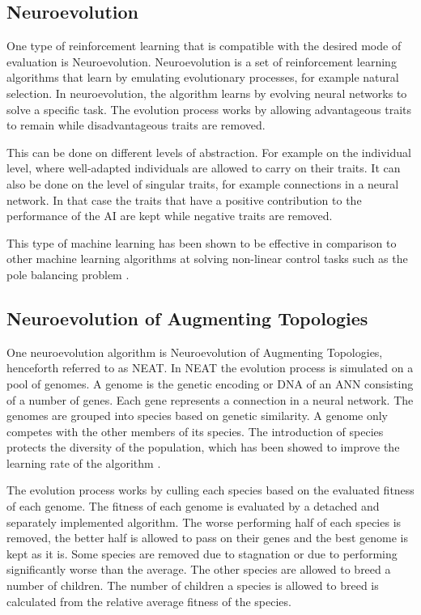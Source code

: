 \subsection{Neuroevolution}
One type of reinforcement learning that is  compatible with the desired mode of evaluation is Neuroevolution. Neuroevolution is a set of reinforcement learning algorithms that learn by emulating evolutionary processes, for example natural selection. In neuroevolution, the algorithm learns by evolving neural networks to solve a specific task. The evolution process works by allowing advantageous traits to remain while disadvantageous traits are removed.  

This can be done on different levels of abstraction. For example on the individual level, where well-adapted individuals are allowed to carry on their traits. It can also be done on the level of singular traits, for example connections in a neural network. In that case the traits that have a positive contribution to the performance of the AI are kept while negative traits are removed. 

This type of machine learning has been shown to be effective in comparison to other machine learning algorithms at solving non-linear control tasks such as the pole balancing problem \cite{gomez:efficient_nonlinear_control}.

\subsection{Neuroevolution of Augmenting Topologies}
\label{theory:neat}
One neuroevolution algorithm is Neuroevolution of Augmenting Topologies, henceforth referred to as NEAT. In NEAT the evolution process is simulated on a pool of genomes. A genome is the genetic encoding or DNA of an ANN consisting of a number of genes. Each gene represents a connection in a neural network. The genomes are grouped into species based on genetic similarity. A genome only competes with the other members of its species. The introduction of species protects the diversity of the population, which has been showed to improve the learning rate of the algorithm \cite{stanley:neat}.  

The evolution process works by culling each species based on the evaluated fitness of each genome. The fitness of each genome is evaluated by a detached and separately implemented algorithm. The worse performing half of each species is removed, the better half is allowed to pass on their genes and the best genome is kept as it is. Some species are removed due to stagnation or due to performing significantly worse than the average. The other species are allowed to breed a number of children. The number of children a species is allowed to breed is calculated from the relative average fitness of the species. 

